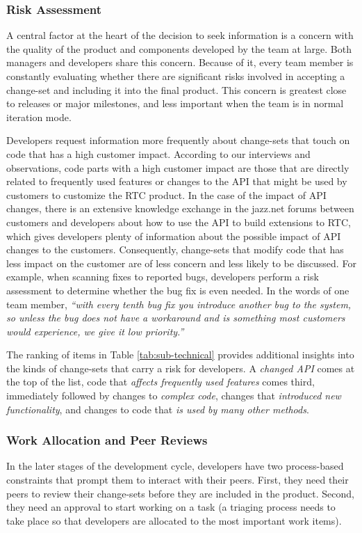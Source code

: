 \subsubsection{Risk Assessment}
A central factor at the heart of the decision to seek information is a concern with the quality of the product and components developed by the team at large. Both managers and developers share this concern. Because of it, every team member is constantly evaluating whether there are significant risks involved in accepting a change-set and including it into the final product. This concern is greatest close to releases or major milestones, and less important when the team is in normal iteration mode.

Developers request information more frequently about change-sets that touch on code that has a high customer impact. According to our interviews and observations, code parts with a high customer impact are those that are directly related to frequently used features or changes to the API that might be used by customers to customize the RTC product. In the case of the impact of API changes, there is an extensive knowledge exchange in the jazz.net forums between customers and developers about how to use the API to build extensions to RTC, which gives developers plenty of information about the possible impact of API changes to the customers. Consequently, change-sets that modify code that has less impact on the customer are of less concern and less likely to be discussed. For example, when scanning fixes to reported bugs, developers perform a risk assessment to determine whether the bug fix is even needed. In the words of one team member, \emph{``with every tenth bug fix you introduce another bug to the system, so unless the bug does not have a workaround and is something most customers would experience, we give it low priority.''}

The ranking of items in Table \ref{tab:sub-technical} provides additional insights into the kinds of change-sets that carry a risk for developers. A \emph{changed API} comes at the top of the list, code that \emph{affects frequently used features} comes third, immediately followed by changes to \emph{complex code}, changes that \emph{introduced new functionality}, and changes to code that \emph{is used by many other methods}.


\subsubsection{Work Allocation and Peer Reviews}
In the later stages of the development cycle, developers have two process-based constraints that prompt them to interact with their peers. First, they need their peers to review their change-sets before they are included in the product. Second, they need an approval to start working on a task (a triaging process needs to take place so that developers are allocated to the most important work items).

